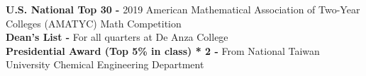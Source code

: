 

\begin{cvparagraph}

\textbf{U.S. National Top 30 - } 2019 American Mathematical Association of Two-Year Colleges (AMATYC) Math Competition     
\\[2pt]
\textbf{Dean's List - } For all quarters at De Anza College 
\\[2pt]
\textbf{Presidential Award (Top 5\% in class) * 2 - } From National Taiwan University Chemical Engineering Department 

\end{cvparagraph}
